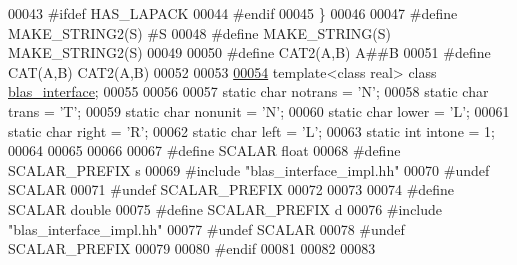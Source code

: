 \begin{DoxyCode}
00043 \textcolor{preprocessor}{#ifdef HAS\_LAPACK}
00044 \textcolor{preprocessor}{#endif}
00045 \}
00046 
00047 \textcolor{preprocessor}{#define MAKE\_STRING2(S) #S}
00048 \textcolor{preprocessor}{#define MAKE\_STRING(S) MAKE\_STRING2(S)}
00049 
00050 \textcolor{preprocessor}{#define CAT2(A,B) A##B}
00051 \textcolor{preprocessor}{#define CAT(A,B) CAT2(A,B)}
00052 
00053 
\hyperlink{classblas__interface}{00054} \textcolor{keyword}{template}<\textcolor{keyword}{class} real> \textcolor{keyword}{class }\hyperlink{classblas__interface}{blas\_interface};
00055 
00056 
00057 \textcolor{keyword}{static} \textcolor{keywordtype}{char} notrans = \textcolor{charliteral}{'N'};
00058 \textcolor{keyword}{static} \textcolor{keywordtype}{char} trans = \textcolor{charliteral}{'T'};
00059 \textcolor{keyword}{static} \textcolor{keywordtype}{char} nonunit = \textcolor{charliteral}{'N'};
00060 \textcolor{keyword}{static} \textcolor{keywordtype}{char} lower = \textcolor{charliteral}{'L'};
00061 \textcolor{keyword}{static} \textcolor{keywordtype}{char} right = \textcolor{charliteral}{'R'};
00062 \textcolor{keyword}{static} \textcolor{keywordtype}{char} left = \textcolor{charliteral}{'L'};
00063 \textcolor{keyword}{static} \textcolor{keywordtype}{int} intone = 1;
00064 
00065 
00066 
00067 \textcolor{preprocessor}{#define SCALAR        float}
00068 \textcolor{preprocessor}{#define SCALAR\_PREFIX s}
00069 \textcolor{preprocessor}{#include "blas\_interface\_impl.hh"}
00070 \textcolor{preprocessor}{#undef SCALAR}
00071 \textcolor{preprocessor}{#undef SCALAR\_PREFIX}
00072 
00073 
00074 \textcolor{preprocessor}{#define SCALAR        double}
00075 \textcolor{preprocessor}{#define SCALAR\_PREFIX d}
00076 \textcolor{preprocessor}{#include "blas\_interface\_impl.hh"}
00077 \textcolor{preprocessor}{#undef SCALAR}
00078 \textcolor{preprocessor}{#undef SCALAR\_PREFIX}
00079 
00080 \textcolor{preprocessor}{#endif}
00081 
00082 
00083 
\end{DoxyCode}
